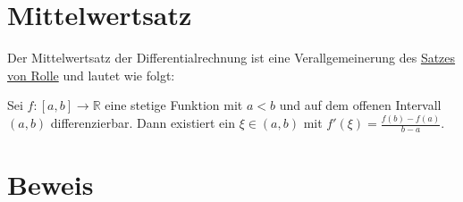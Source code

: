 \documentclass[fontsize=9pt,
               parskip=half-,
               DIV=14,
               listof=chapterentry,
               tocflat]{scrbook}
\begin{document}
\section{Mittelwertsatz}

Der Mittelwertsatz der Differentialrechnung ist eine Verallgemeinerung des \href{https://de.wikibooks.org/wiki/Mathe\_für\_Nicht-Freaks:\_Satz\_von\_Rolle}
{Satzes von Rolle} und lautet wie folgt:

\begin{theorem*}[Mittelwertsatz]
Sei $f:[a,b]\to \mathbb {R} $ eine stetige Funktion mit $a<b$ und auf dem offenen Intervall $(a,b)$ differenzierbar. Dann existiert ein $\xi \in (a,b)$ mit $f'(\xi )={\frac {f(b)-f(a)}{b-a}}$.

\end{theorem*}

\section{Beweis}
\end{document}
